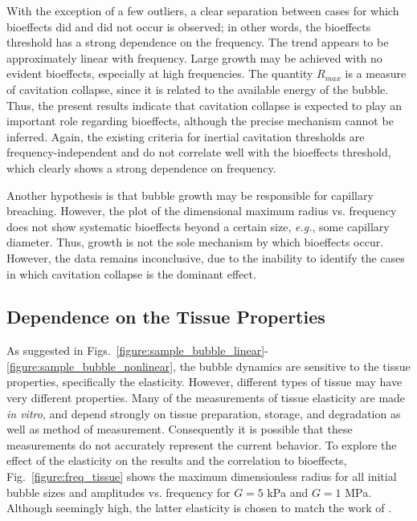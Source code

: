 With the exception of a few outliers, a clear separation between cases
for which bioeffects did and did not occur is observed; in other
words, the bioeffects threshold has a strong dependence on the
frequency. The trend appears to be approximately linear with
frequency. Large growth may be achieved with no evident bioeffects,
especially at high frequencies. The quantity $R_{max}$ is a
measure of cavitation collapse, since it is related to the available
energy of the bubble. Thus, the present results indicate that
cavitation collapse is expected to play an important role regarding
bioeffects, although the precise mechanism cannot be inferred.  Again,
the existing criteria for inertial cavitation thresholds are
frequency-independent and do not correlate well with the bioeffects
threshold, which clearly shows a strong dependence on frequency.

Another hypothesis is that bubble growth may be responsible for
capillary breaching. However, the plot of the dimensional maximum radius vs. frequency does
not show systematic bioeffects beyond a certain size, \emph{e.g.},
some capillary diameter. Thus, growth is not the sole mechanism by
which bioeffects occur. However, the data remains inconclusive,
due to the inability to identify the cases in which cavitation
collapse is the dominant effect.






\subsection{Dependence on the Tissue Properties}
\label{section:tissue_properties}

As suggested in
Figs.~\ref{figure:sample_bubble_linear}-\ref{figure:sample_bubble_nonlinear},
the bubble dynamics are sensitive to the tissue properties,
specifically the elasticity. However, different types of tissue may
have very different properties. Many of the measurements of tissue elasticity are made
\emph{in vitro}, and depend strongly on tissue preparation, storage,
and degradation as well as method of measurement.  Consequently it is
possible that these measurements do not accurately represent the
current behavior.  To explore the effect of the elasticity on the
results and the correlation to bioeffects, Fig.~\ref{figure:freq_tissue}
shows the maximum dimensionless radius for all initial bubble sizes
and amplitudes vs. frequency for $G=5$ kPa and $G=1$ MPa. Although
seemingly high, the latter elasticity is chosen to match the work of
\cite{Yang2005}.

